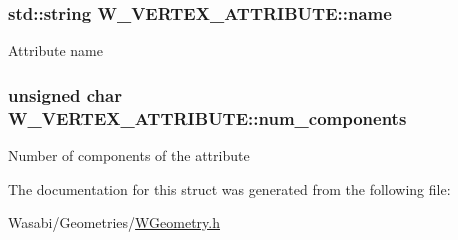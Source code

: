 \subsubsection[{\texorpdfstring{name}{name}}]{\setlength{\rightskip}{0pt plus 5cm}std\+::string W\+\_\+\+V\+E\+R\+T\+E\+X\+\_\+\+A\+T\+T\+R\+I\+B\+U\+T\+E\+::name}\hypertarget{struct_w___v_e_r_t_e_x___a_t_t_r_i_b_u_t_e_a428e56ded0a3989a627db00fc59613c8}{}\label{struct_w___v_e_r_t_e_x___a_t_t_r_i_b_u_t_e_a428e56ded0a3989a627db00fc59613c8}
Attribute name 
\subsubsection[{\texorpdfstring{num\+\_\+components}{num_components}}]{\setlength{\rightskip}{0pt plus 5cm}unsigned char W\+\_\+\+V\+E\+R\+T\+E\+X\+\_\+\+A\+T\+T\+R\+I\+B\+U\+T\+E\+::num\+\_\+components}\hypertarget{struct_w___v_e_r_t_e_x___a_t_t_r_i_b_u_t_e_a79739d8644e1aa585131fc54648cd047}{}\label{struct_w___v_e_r_t_e_x___a_t_t_r_i_b_u_t_e_a79739d8644e1aa585131fc54648cd047}
Number of components of the attribute 

The documentation for this struct was generated from the following file\+:\begin{DoxyCompactItemize}
\item 
Wasabi/\+Geometries/\hyperlink{_w_geometry_8h}{W\+Geometry.\+h}\end{DoxyCompactItemize}
